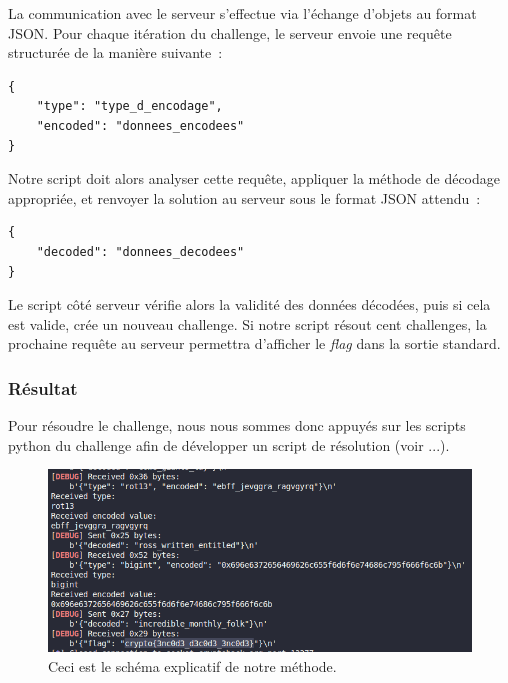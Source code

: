 La communication avec le serveur s'effectue via l'échange d'objets au format
JSON. Pour chaque itération du challenge, le serveur envoie une requête
structurée de la manière suivante~:

\begin{verbatim}
{
    "type": "type_d_encodage",
    "encoded": "donnees_encodees"
}
\end{verbatim}

Notre script doit alors analyser cette requête, appliquer la méthode de
décodage appropriée, et renvoyer la solution au serveur sous le format JSON
attendu~:

\begin{verbatim}
{
    "decoded": "donnees_decodees"
}
\end{verbatim}

Le script côté serveur vérifie alors la validité des données décodées, puis
si cela est valide, crée un nouveau challenge. Si notre script résout cent
challenges, la prochaine requête au serveur permettra d'afficher le
\textit{flag} dans la sortie standard.

\subsubsection{Résultat}
Pour résoudre le challenge, nous nous sommes donc appuyés sur les scripts
python du challenge afin de développer un script de résolution (voir ...).

\begin{figure}[H]
    \centering
    \includegraphics[width=0.8\linewidth]{Images/Encode/encode_chall_result.png}

    \caption{Ceci est le schéma explicatif de notre méthode.}

    \label{fig:encodeChallRes}
\end{figure}

